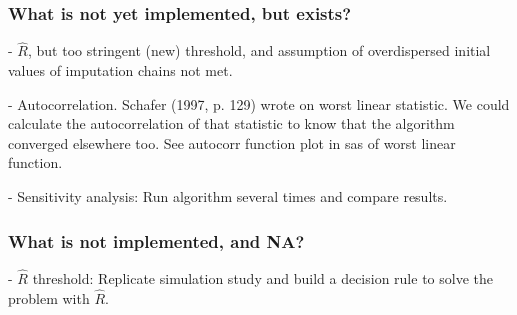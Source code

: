 \documentclass[article]{jss}
\begin{document}
\subsubsection{What is not yet implemented, but exists?}

- $\widehat{R}$, but too stringent (new) threshold, and assumption of overdispersed initial values of imputation chains not met.

- Autocorrelation. Schafer (1997, p. 129) wrote on worst linear statistic. We could calculate the autocorrelation of that statistic to know that the algorithm converged elsewhere too. See autocorr function plot in sas of worst linear function.

- Sensitivity analysis: Run algorithm several times and compare results. 

\subsubsection{What is not implemented, and NA?}

- $\hat{R}$ threshold: Replicate simulation study and build a decision rule to solve the problem with $\hat{R}$.
\end{document}
